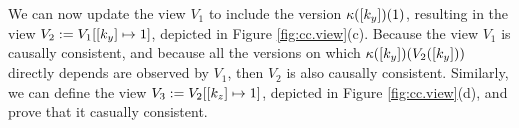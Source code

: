 \begin{example}
%
%
%
%
%
%
%
%
%
% 
We can now update the view $V_1$ to include the version $\kappa([k_y])(1)$, 
resulting in the view $V_2 := V_1[ [k_y] \mapsto 1]$, depicted in Figure \ref{fig:cc.view}(c). 
Because the view $V_1$ is 
causally consistent, and because all the versions on which $\kappa([k_y])(V_2([k_y]))$ directly depends
are observed by $V_1$, then $V_2$ is also causally consistent. Similarly, we can define 
the view $V_3 := V_2[[k_z] \mapsto 1]$, depicted in Figure \ref{fig:cc.view}(d), 
and prove that it casually consistent. 


\end{example}
